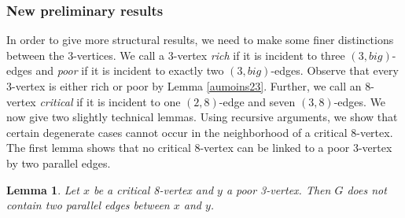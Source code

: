 \documentclass{article}
\theoremstyle{plain}
\newtheorem{Lemma}{Lemma}
\theoremstyle{nonumberplain}
\theoremstyle{nonumberplain}
\begin{document}
\subsubsection{New preliminary results}\label{tech1}
In order to give more structural results, we need to make some finer distinctions between the 3-vertices. We call a 3-vertex {\it rich} if it is incident to three $(3,big)$-edges and {\it poor} if it is incident to exactly two $(3,big)$-edges. Observe that every 3-vertex is either rich or poor by Lemma \ref{aumoins23}. Further, we call an 8-vertex {\it critical} if it is incident to one $(2,8)$-edge and seven $(3,8)$-edges. We now give two slightly technical lemmas. Using recursive arguments, we show that certain degenerate cases cannot occur in the neighborhood of a critical 8-vertex. The first lemma shows that no critical 8-vertex can be linked to a poor 3-vertex by two parallel edges. 
\begin{Lemma}\label{drzrz}
Let $x$ be a critical 8-vertex and $y$ a poor 3-vertex. Then $G$ does not contain two parallel edges between $x$ and $y$.
\end{Lemma}
\end{document}
